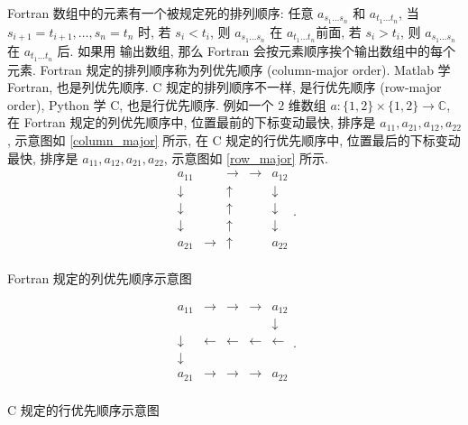 \def\la{\leftarrow}
\def\ra{\rightarrow}
\def\ua{\uparrow}
\def\da{\downarrow}
Fortran 数组中的元素有一个被规定死的排列顺序: 任意 $a_{s_1\dots s_n}$ 和 $a_{t_1\dots t_n}$, 当 $s_{i+1}=t_{i+1},\dots,s_n=t_n$ 时, 若 $s_i<t_i$, 则 $a_{s_1\dots s_n}$ 在 $a_{t_1\dots t_n}$前面, 若 $s_i>t_i$, 则 $a_{s_1\dots s_n}$ 在 $a_{t_1\dots t_n}$ 后. 如果用  输出数组, 那么 Fortran 会按元素顺序挨个输出数组中的每个元素. Fortran 规定的排列顺序称为列优先顺序 (column-major order). Matlab 学 Fortran, 也是列优先顺序. C 规定的排列顺序不一样, 是行优先顺序 (row-major order), Python 学 C, 也是行优先顺序. 例如一个 $2$ 维数组 $a\colon \{1,2\}\times\{1,2\}\to\mathbb{C}$, 在 Fortran 规定的列优先顺序中, 位置最前的下标变动最快, 排序是 $a_{11},a_{21},a_{12},a_{22}$, 示意图如 \ref{column_major} 所示, 在 C 规定的行优先顺序中, 位置最后的下标变动最快, 排序是 $a_{11},a_{12},a_{21},a_{22}$, 示意图如 \ref{row_major} 所示.
\begin{equation}
    \begin{matrix}
        a_{11}&&\ra&\ra&a_{12}\\
        \da&&\ua&&\da\\
        \da&&\ua&&\da\\
        \da&&\ua&&\da\\
        a_{21}&\ra&\ua&&a_{22}\\
    \end{matrix}.\label{column_major}
\end{equation}
\begin{center}
    Fortran 规定的列优先顺序示意图
\end{center}
\begin{equation}
    \begin{matrix}
        a_{11}&\ra&\ra&\ra&a_{12}\\
        &&&&\da\\
        \da&\la&\la&\la&\la\\
        \da&&&&\\
        a_{21}&\ra&\ra&\ra&a_{22}\\
    \end{matrix}.\label{row_major}
\end{equation}
\begin{center}
    C 规定的行优先顺序示意图
\end{center}

